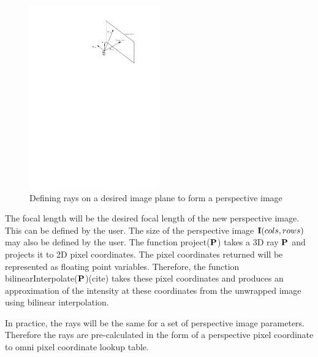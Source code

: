 \begin{figure}[h!]
  \centering
    \includegraphics[width=0.5\textwidth]{chapters/images/omni_perspective}
  \caption{Defining rays on a desired image plane to form a perspective image}
  \label{fig:omni_perspective}
\end{figure}

The focal length will be the desired focal length of the new perspective image. This can be defined by the user.  The size of the perspective image $\mathbf I(cols, rows)$ may also be defined by the user.  The function project($\mathbf P$) takes a 3D ray $\mathbf P$ and projects it to 2D pixel coordinates.  The pixel coordinates returned will be represented as floating point variables.  Therefore, the function bilinearInterpolate($\mathbf P$)(cite) takes these pixel coordinates and produces an approximation of the intensity at these coordinates from the unwrapped image using bilinear interpolation.

In practice, the rays will be the same for a set of perspective image parameters.  Therefore the rays are pre-calculated in the form of a perspective pixel coordinate to omni pixel coordinate lookup table.

